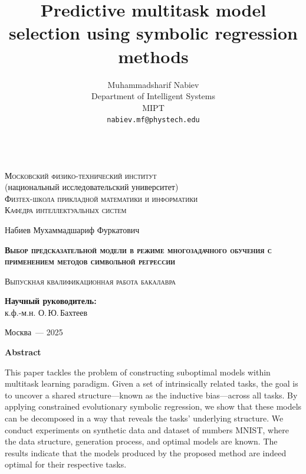 \documentclass[14pt]{extarticle}
\title{Predictive multitask model selection using symbolic regression methods}
\author{
    Muhammadsharif Nabiev \\
    Department of Intelligent Systems\\
    MIPT\\
    \texttt{nabiev.mf@phystech.edu} \\
    \texttt{} \\
}
\date{}
\begin{document}

\thispagestyle{empty}

\begin{titlepage}
    \begin{center}
        \textsc{Московский физико-технический институт}\\
        (национальный исследовательский университет)\\
        \textsc{Физтех-школа прикладной математики и информатики}\\
        \textsc{Кафедра интеллектуальных систем}
    \end{center}
    \vspace{2.5cm}
    \begin{center}
        {Набиев Мухаммадшариф Фуркатович}
        \par
        \vspace{2cm}
        {\Large \textsc{\textbf{Выбор предсказательной модели в режиме многозадачного обучения с применением методов символьной регрессии}}}
        \par
        \par
        \vspace{2cm}
        \textsc{Выпускная квалификационная работа бакалавра}
    \end{center}
    \vspace{2cm}
    \hfill\parbox{8,4cm}{\textbf{Научный руководитель:}
    \\к.ф.-м.н. О.\,Ю.\,Бахтеев}
    \par
    \vspace{1.5cm}
    \begin{center}
        {Москва~--- 2025}
    \end{center}
\end{titlepage}
\setcounter{page}{2}
\newpage
\begin{center}
    \Large{\textbf{Abstract}}
\end{center}
This paper tackles the problem of constructing suboptimal models within multitask learning paradigm. Given a set of intrinsically related tasks, the goal is to uncover a shared structure—known as the inductive bias—across all tasks. By applying constrained evolutionary symbolic regression, we show that these models can be decomposed in a way that reveals the tasks' underlying structure. We conduct experiments on synthetic data and dataset of numbers MNIST, where the data structure, generation process, and optimal models are known. The results indicate that the models produced by the proposed method are indeed optimal for their respective tasks.
\newpage
\tableofcontents
\newpage
\end{document}
